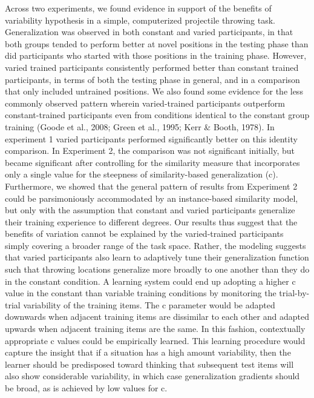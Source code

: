 \documentclass[
  jou, donotrepeattitle,floatsintext]{apa7}
\begin{document}
Across two experiments, we found evidence in support of the benefits of variability hypothesis in a simple, computerized projectile throwing task. Generalization was observed in both constant and varied participants, in that both groups tended to perform better at novel positions in the testing phase than did participants who started with those positions in the training phase. However, varied trained participants consistently performed better than constant trained participants, in terms of both the testing phase in general, and in a comparison that only included untrained positions. We also found some evidence for the less commonly observed pattern wherein varied-trained participants outperform constant-trained participants even from conditions identical to the constant group training (Goode et al., 2008; Green et al., 1995; Kerr \& Booth, 1978). In experiment 1 varied participants performed significantly better on this identity comparison. In Experiment 2, the comparison was not significant initially, but became significant after controlling for the similarity measure that incorporates only a single value for the steepness of similarity-based generalization (c). Furthermore, we showed that the general pattern of results from Experiment 2 could be parsimoniously accommodated by an instance-based similarity model, but only with the assumption that constant and varied participants generalize their training experience to different degrees. Our results thus suggest that the benefits of variation cannot be explained by the varied-trained participants simply covering a broader range of the task space. Rather, the modeling suggests that varied participants also learn to adaptively tune their generalization function such that throwing locations generalize more broadly to one another than they do in the constant condition. A learning system could end up adopting a higher c value in the constant than variable training conditions by monitoring the trial-by-trial variability of the training items. The c parameter would be adapted downwards when adjacent training items are dissimilar to each other and adapted upwards when adjacent training items are the same. In this fashion, contextually appropriate c values could be empirically learned. This learning procedure would capture the insight that if a situation has a high amount variability, then the learner should be predisposed toward thinking that subsequent test items will also show considerable variability, in which case generalization gradients should be broad, as is achieved by low values for c.
\end{document}
